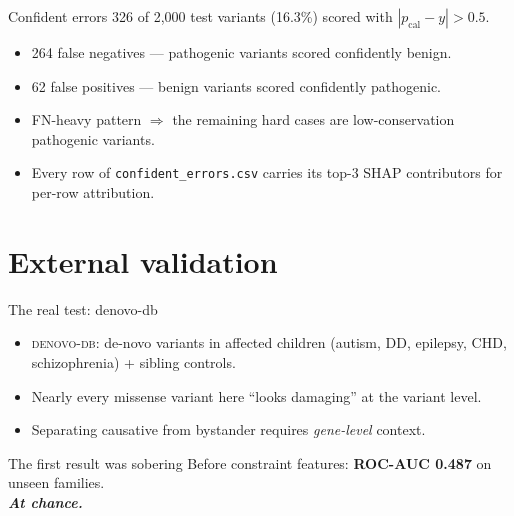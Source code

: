 \documentclass[aspectratio=169]{beamer}
\begin{document}
\begin{frame}{Confident errors}
  326 of 2{,}000 test variants (16.3\%) scored with
  $|p_{\text{cal}} - y| > 0.5$.
  \vspace{0.5em}
  \begin{itemize}
    \item \textcolor{alert}{264 false negatives} --- pathogenic
          variants scored confidently benign.
    \item \textcolor{subtle}{62 false positives} --- benign variants
          scored confidently pathogenic.
    \item FN-heavy pattern $\Rightarrow$ the remaining hard cases
          are low-conservation pathogenic variants.
    \item Every row of \texttt{confident\_errors.csv} carries its
          top-3 SHAP contributors for per-row attribution.
  \end{itemize}
\end{frame}


\section{External validation}

\begin{frame}{The real test: denovo-db}
  \begin{itemize}
    \item \textsc{denovo-db}: de-novo variants in affected children
          (autism, DD, epilepsy, CHD, schizophrenia) + sibling
          controls.
    \item Nearly every missense variant here ``looks damaging'' at
          the variant level.
    \item Separating causative from bystander requires
          \emph{gene-level} context.
  \end{itemize}
  \begin{alertblock}{The first result was sobering}
    \centering
    \large Before constraint features: \textbf{ROC-AUC 0.487}
    on unseen families. \\ \vspace{0.3em}
    \textbf{\emph{At chance.}}
  \end{alertblock}
\end{frame}
\end{document}
